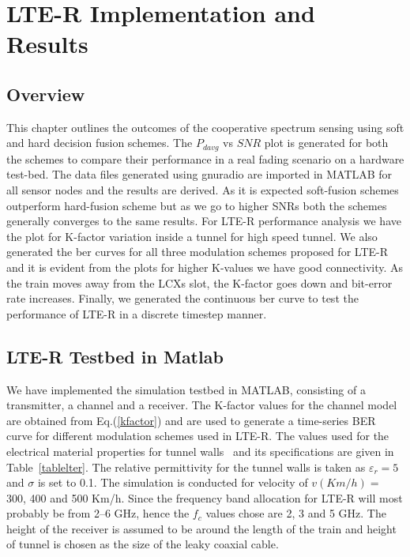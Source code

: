 \chapter{LTE-R Implementation and Results}
\label{chapter6}
\section{Overview} 
This chapter outlines the outcomes of the cooperative spectrum sensing using soft and hard decision fusion schemes. The $P_{davg}$ vs $SNR$ plot is generated for both the schemes to compare their performance in a real fading scenario on a hardware test-bed. The data files generated using gnuradio are imported in MATLAB for all sensor nodes and the results are derived. As it is expected soft-fusion schemes outperform hard-fusion scheme but as we go to higher SNRs both the schemes generally converges to the same results. For LTE-R performance analysis we have the plot for K-factor variation inside a tunnel for high speed tunnel. We also generated the ber curves for all three modulation schemes proposed for LTE-R and it is evident from the plots for higher K-values we have good connectivity. As the train moves away from the LCXs slot, the K-factor goes down and bit-error rate increases. Finally, we generated the continuous ber curve to test the performance of LTE-R in a discrete timestep manner.

\section{LTE-R Testbed in Matlab}

We have implemented the simulation testbed in MATLAB, consisting of a transmitter, a channel and a receiver. The K-factor values for the channel model are obtained from Eq.(\ref{kfactor}) and are used to generate a time-series BER curve for different modulation schemes used in LTE-R. The values used for the electrical material properties for tunnel walls~\cite{lter17} and its
specifications are given in Table~\ref{tablelter}. The relative permittivity for the tunnel walls is taken as $\varepsilon_r = 5$ and $\sigma$ is set to 0.1. The simulation is conducted for velocity of $v (Km/h) = $ 300, 400 and 500 Km/h. Since the frequency band allocation for LTE-R will most probably be from 2--6 GHz, hence the $f_c$ values chose are 2, 3 and 5 GHz. The height of the receiver is assumed to be around the length of the train and height of tunnel is chosen as the size of the leaky coaxial cable.


